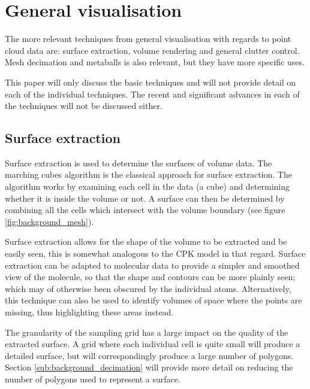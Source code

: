 

\section{General visualisation}
\label{sec:background_general}


The more relevant techniques from general visualisation with regards to point
cloud data are: surface extraction, volume rendering and general clutter
control. Mesh decimation and metaballs is also relevant, but they have more
specific uses.

This paper will only discuss the basic techniques and will not provide detail
on each of the individual techniques. The recent and significant advances in
each of the techniques will not be discussed either.


\subsection{Surface extraction}
\label{sub:background_surface}

Surface extraction is used to determine the surfaces of volume data. The
marching cubes algorithm \citep{lorensen87} is the classical approach for
surface extraction. The algorithm works by examining each cell in the data (a
cube) and determining whether it is inside the volume or not. A surface can
then be determined by combining all the cells which intersect with the volume
boundary (see figure \ref{fig:background_mesh}).

Surface extraction allows for the shape of the volume to be extracted and be
easily seen, this is somewhat analogous to the CPK model in that regard.
Surface extraction can be adapted to molecular data to provide a simpler and
smoothed view of the molecule, so that the shape and contours can be more
plainly seen; which may of otherwise been obscured by the individual atoms.
Alternatively, this technique can also be used to identify volumes of space
where the points are missing, thus highlighting these areas instead.

The granularity of the sampling grid has a large impact on the quality of the
extracted surface. A grid where each individual cell is quite small will
produce a detailed surface, but will correspondingly produce a large number of
polygons. Section \ref{sub:background_decimation} will provide more detail on
reducing the number of polygons used to represent a surface.

